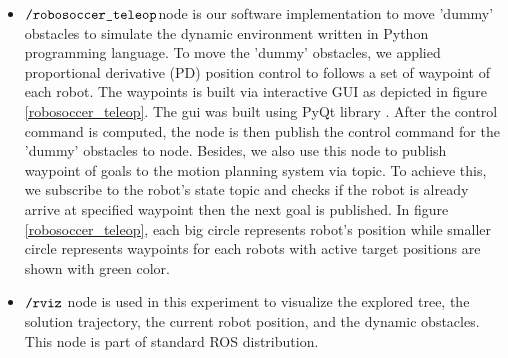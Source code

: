 \documentclass[../thesis.tex]{subfiles}
\begin{document}
\begin{itemize}
\item{$\texttt{/robosoccer\_teleop}$}node is our software implementation to move 'dummy' obstacles to simulate the dynamic environment written in Python programming language. To move the 'dummy' obstacles, we applied proportional derivative (PD) position control to follows a set of waypoint of each robot. The waypoints is built via interactive GUI as depicted in figure \ref{robosoccer_teleop}. The gui was built using PyQt library \cite{computing2013pyqt}. After the control command is computed, the node is then publish the control command for the 'dummy' obstacles to  node. Besides, we also use this node to publish waypoint of goals to the motion planning system via  topic. To achieve this, we subscribe to the robot's state topic and checks if the robot is already arrive at specified waypoint then the next goal is published. In figure \ref{robosoccer_teleop}, each big circle represents robot's position while smaller circle represents waypoints for each robots with active target positions are shown with green color.
\item{$\texttt{/rviz}$} node is used in this experiment to visualize the explored tree, the solution trajectory, the current robot position, and the dynamic obstacles. This node is part of standard ROS distribution.
\end{itemize}
\end{document}
